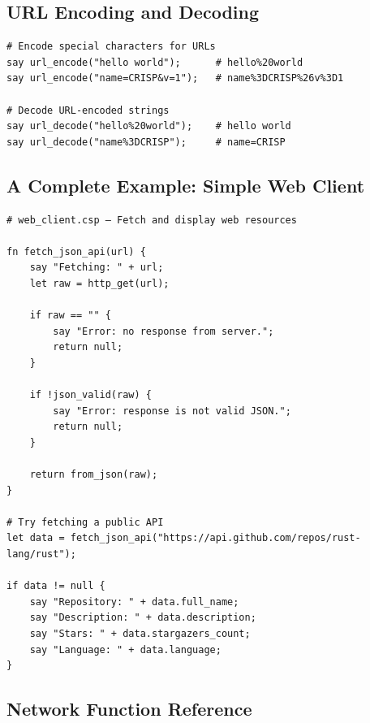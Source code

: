 \subsection{URL Encoding and Decoding}

\begin{tcolorbox}[colback=codebg, colframe=darkpurple, colbacktitle=darkpurple, title=\textbf{\textcolor{codegold}{URL Encoding}}, fonttitle=\bfseries, sharp corners]
\begin{lstlisting}
# Encode special characters for URLs
say url_encode("hello world");      # hello%20world
say url_encode("name=CRISP&v=1");   # name%3DCRISP%26v%3D1

# Decode URL-encoded strings
say url_decode("hello%20world");    # hello world
say url_decode("name%3DCRISP");     # name=CRISP
\end{lstlisting}
\end{tcolorbox}

\subsection{A Complete Example: Simple Web Client}

\begin{tcolorbox}[colback=codebg, colframe=darkpurple, colbacktitle=darkpurple, title=\textbf{\textcolor{codegold}{Web Client (web\_client.csp)}}, fonttitle=\bfseries, sharp corners]
\begin{lstlisting}
# web_client.csp — Fetch and display web resources

fn fetch_json_api(url) {
    say "Fetching: " + url;
    let raw = http_get(url);

    if raw == "" {
        say "Error: no response from server.";
        return null;
    }

    if !json_valid(raw) {
        say "Error: response is not valid JSON.";
        return null;
    }

    return from_json(raw);
}

# Try fetching a public API
let data = fetch_json_api("https://api.github.com/repos/rust-lang/rust");

if data != null {
    say "Repository: " + data.full_name;
    say "Description: " + data.description;
    say "Stars: " + data.stargazers_count;
    say "Language: " + data.language;
}
\end{lstlisting}
\end{tcolorbox}

\subsection{Network Function Reference}

